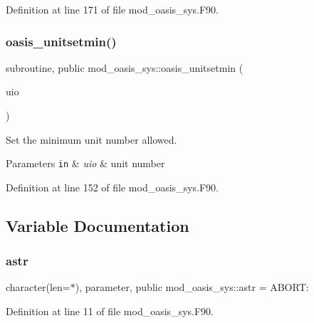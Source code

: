 Definition at line 171 of file mod\+\_\+oasis\+\_\+sys.\+F90.

\mbox{\label{namespacemod__oasis__sys_a063a41b73546564afd294fd5708b6667}} 
\subsubsection{\texorpdfstring{oasis\+\_\+unitsetmin()}{oasis\_unitsetmin()}}
{\footnotesize\ttfamily subroutine, public mod\+\_\+oasis\+\_\+sys\+::oasis\+\_\+unitsetmin (\begin{DoxyParamCaption}\item[{integer(kind=ip\+\_\+intwp\+\_\+p), intent(in)}]{uio }\end{DoxyParamCaption})}



Set the minimum unit number allowed. 


\begin{DoxyParams}[1]{Parameters}
\mbox{\tt in}  & {\em uio} & unit number \\
\hline
\end{DoxyParams}


Definition at line 152 of file mod\+\_\+oasis\+\_\+sys.\+F90.



\subsection{Variable Documentation}
\mbox{\label{namespacemod__oasis__sys_aad26202d309c5b33de4cddb54c7edc99}} 
\subsubsection{\texorpdfstring{astr}{astr}}
{\footnotesize\ttfamily character(len=$\ast$), parameter, public mod\+\_\+oasis\+\_\+sys\+::astr = \textquotesingle{} A\+B\+O\+R\+T\+: \textquotesingle{}}



Definition at line 11 of file mod\+\_\+oasis\+\_\+sys.\+F90.

